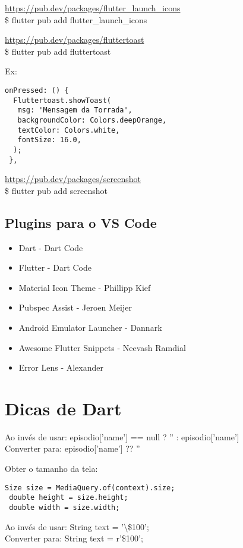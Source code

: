 \documentclass[11pt]{scrartcl}
\begin{document}
\url{https://pub.dev/packages/flutter_launch_icons} \\
{\ttfamily\$ flutter pub add flutter\_launch\_icons}

\url{https://pub.dev/packages/fluttertoast} \\
{\ttfamily\$ flutter pub add fluttertoast} 

Ex:
\begin{lstlisting}[]
 onPressed: () {
  Fluttertoast.showToast(
   msg: 'Mensagem da Torrada',
   backgroundColor: Colors.deepOrange,
   textColor: Colors.white,
   fontSize: 16.0,
  );
 },
\end{lstlisting}

\url{https://pub.dev/packages/screenshot} \\
{\ttfamily\$ flutter pub add screenshot}

\subsection{Plugins para o VS Code}
\begin{itemize}[nolistsep]
	\item Dart - Dart Code
	\item Flutter - Dart Code
	\item Material Icon Theme - Phillipp Kief
	\item Pubspec Assist - Jeroen Meijer
	\item Android Emulator Launcher - Dannark
	\item Awesome Flutter Snippets - Neevash Ramdial
	\item Error Lens - Alexander
\end{itemize}

\section{Dicas de Dart}

Ao invés de usar: {\ttfamily episodio['name'] == null ? '' : episodio['name']} \\
Converter para: {\ttfamily episodio['name'] ?? ''}

Obter o tamanho da tela:
\begin{lstlisting}[]
 Size size = MediaQuery.of(context).size;
 double height = size.height;
 double width = size.width;
\end{lstlisting}

Ao invés de usar: {\ttfamily String text = '$\setminus$\$100';} \\
Converter para: {\ttfamily String text = r'\$100';}
\end{document}
